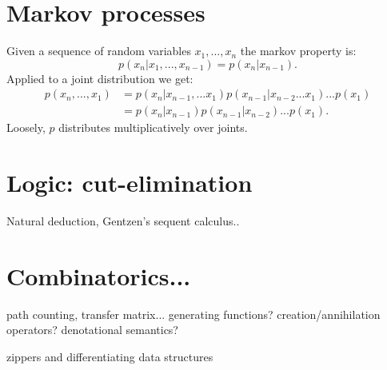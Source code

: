 \documentclass[11pt]{article}
\begin{document}
%
%

\section{Markov processes}

Given a sequence of random variables $x_1,...,x_n$
the markov property is:
$$
    p(x_n|x_1,...,x_{n-1}) = p(x_n|x_{n-1}).
$$
Applied to a joint distribution we get:
\begin{align*}
    p(x_n,...,x_1) &= p(x_n|x_{n-1},...x_1) p(x_{n-1}|x_{n-2}...x_1)...p(x_1)\\
                    &= p(x_n|x_{n-1}) p(x_{n-1}|x_{n-2})...p(x_1).
\end{align*}
Loosely, $p$ distributes multiplicatively over joints.


%
%

\section{Logic: cut-elimination}

Natural deduction, Gentzen's sequent calculus..

%
%

\section{Combinatorics...}

path counting, transfer matrix...
generating functions? 
creation/annihilation operators?
denotational semantics?

zippers and differentiating data structures



\end{document}
